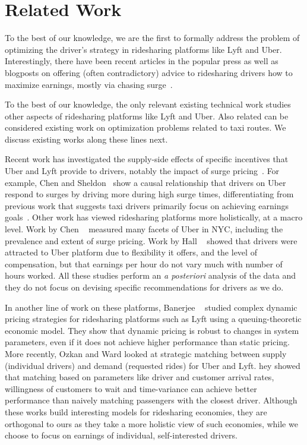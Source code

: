 
\section{Related Work}
\label{sec:related_work}

To the best of our knowledge, we are the first to formally address the problem of optimizing
the driver's strategy in ridesharing platforms like Lyft and Uber. 
Interestingly, there have been recent articles in the popular press as well as blogposts on 
offering (often contradictory) advice to ridesharing drivers how to maximize earnings, mostly via chasing surge~\cite{dont,tips}.

To the best of our knowledge, the only relevant existing technical work 
studies other aspects of ridesharing platforms like Lyft and Uber. 
Also related can be considered existing work on optimization problems related to taxi routes. We discuss existing works along these lines next.


Recent work has investigated the supply-side effects of specific incentives that Uber and Lyft provide to drivers, notably the impact of surge pricing~\cite{slaves}.  For example, Chen and Sheldon~\cite{chen2016dynamic} show 
a causal relationship that drivers on Uber respond to surges by driving more during high surge times,  differentiating from previous work that suggests taxi drivers primarily focus on achieving earnings goals~\cite{camerer1997labor}. 
Other work has viewed ridesharing platforms more holistically, at a macro level.
Work by Chen {\etal}~\cite{chen2015peeking} measured many facets of Uber in NYC, including the prevalence and extent 
  of surge pricing.
Work by Hall {\etal}~\cite{hall2016analysis} showed that drivers were attracted to Uber platform due to flexibility it offers, 
and the level of compensation, but that earnings per hour do not vary much with number of hours worked. 
All these studies perform an {\em a posteriori} analysis of the data
and they do not focus on devising specific recommendations for drivers as we do.


 In another line of work on these platforms, Banerjee {\etal}~\cite{banerjee2015pricing} studied complex dynamic
pricing strategies for ridesharing platforms such as Lyft using a queuing-theoretic economic model. 
They show that dynamic pricing is robust to changes in system parameters, even if it does not 
  achieve higher performance than static pricing.  
More recently, Ozkan and Ward\cite{ozkan2016dynamic} looked at strategic matching between supply (individual drivers) 
  and demand (requested rides) for Uber and Lyft.
 hey showed that matching based on parameters like driver and customer arrival rates, 
  willingness of customers to wait and time-variance can achieve better performance than naively matching 
  passengers with the closest driver. 
Although these works build interesting models for ridesharing economies, they are
 orthogonal to ours as they take a more holistic view of such economies, while we choose to focus 
 on earnings of individual, self-interested drivers.




